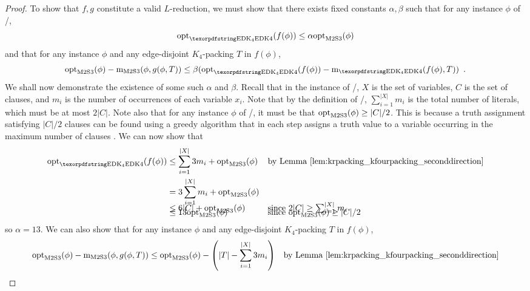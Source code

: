 \begin{proof}
To show that $f, g$ constitute a valid $L$-reduction, we must show that there exists fixed constants $\alpha, \beta$ such that for any instance $\phi$ of \maxtwosatthree/,
\begin{align*}
    \textrm{opt}_{\textrm{\edkfour}}(f(\phi)) \leq \alpha \textrm{opt}_{\textrm{\maxtwosatthreeshort/}}(\phi)
\end{align*}
and that for any instance $\phi$ and any edge-disjoint $K_4$-packing $T$ in $f(\phi)$,
\begin{align*}
    \textrm{opt}_{\textrm{\maxtwosatthreeshort/}}(\phi) - \textrm{m}_{\textrm{\maxtwosatthreeshort/}}(\phi, g(\phi, T)) \leq \beta(\textrm{opt}_{\textrm{\edkfour}}(f(\phi)) - \textrm{m}_{\textrm{\edkfour}}(f(\phi), T))\enspace.
\end{align*}
We shall now demonstrate the existence of some such $\alpha$ and $\beta$. Recall that in the instance of \maxtwosatthree/, $X$ is the set of variables, $C$ is the set of clauses, and $m_i$ is the number of occurrences of each variable $x_i$. Note that by the definition of \maxtwosatthree/, $\sum_{i=1}^{|X|} m_i$ is the total number of literals, which must be at most $2|C|$. Note also that for any instance $\phi$ of \maxtwosatthree/, it must be that $\textrm{opt}_{\textrm{\maxtwosatthreeshort/}}(\phi) \geq |C|/2$. This is because a truth assignment satisfying $|C|/2$ clauses can be found using a greedy algorithm that in each step assigns a truth value to a variable occurring in the maximum number of clauses \cite{approximationvazirani}. We can now show that
\begin{align*}
    \textrm{opt}_{\textrm{\edkfour}}(f(\phi)) &\leq \sum\limits_{i=1}^{|X|} 3 m_i + \textrm{opt}_{\textrm{\maxtwosatthreeshort/}}(\phi) && \mbox{by Lemma~\ref{lem:krpacking_kfourpacking_seconddirection}}\\
    &= 3 \sum\limits_{i=1}^{|X|} m_i + \textrm{opt}_{\textrm{\maxtwosatthreeshort/}}(\phi)\\[-0.8em]
    &\leq 6|C| + \textrm{opt}_{\textrm{\maxtwosatthreeshort/}}(\phi) && \mbox{since $2|C| \geq \sum_{i=1}^{|X|} m_i$}\\[-1.0em]
    &\leq 13 \textrm{opt}_{\textrm{\maxtwosatthreeshort/}}(\phi)  && \mbox{since $\textrm{opt}_{\textrm{\maxtwosatthreeshort/}}(\phi) \geq |C|/2$}
\end{align*}
so $\alpha = 13$. We can also show that for any instance $\phi$ and any edge-disjoint $K_4$-packing $T$ in $f(\phi)$, 
\begin{align*}
    \textrm{opt}_{\textrm{\maxtwosatthreeshort/}}(\phi) - \textrm{m}_{\textrm{\maxtwosatthreeshort/}}(\phi, g(\phi, T)) &\leq \textrm{opt}_{\textrm{\maxtwosatthreeshort/}}(\phi) - \left(|T| - \sum\limits_{i=1}^{|X|} 3 m_i \right) && \mbox{by Lemma~\ref{lem:krpacking_kfourpacking_seconddirection}}\\

\end{align*}
\end{proof}
